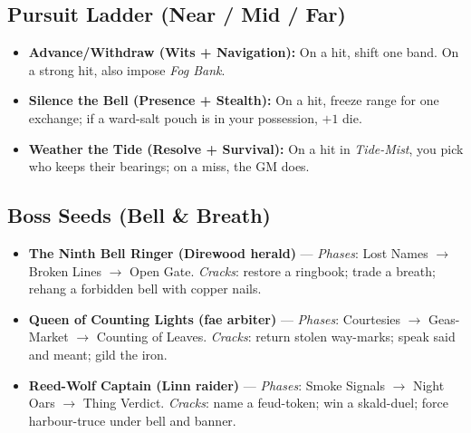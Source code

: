 \subsection*{Pursuit Ladder (Near / Mid / Far)}
\begin{itemize}
\item \textbf{Advance/Withdraw (Wits + Navigation):} On a hit, shift one band. On a strong hit, also impose \emph{Fog Bank}.
\item \textbf{Silence the Bell (Presence + Stealth):} On a hit, freeze range for one exchange; if a ward-salt pouch is in your possession, $+1$ die.
\item \textbf{Weather the Tide (Resolve + Survival):} On a hit in \emph{Tide-Mist}, you pick who keeps their bearings; on a miss, the GM does.
\end{itemize}

\subsection*{Boss Seeds (Bell \& Breath)}
\begin{itemize}
\item \textbf{The Ninth Bell Ringer (Direwood herald)} --- \emph{Phases}: Lost Names $\rightarrow$ Broken Lines $\rightarrow$ Open Gate. \emph{Cracks}: restore a ringbook; trade a breath; rehang a forbidden bell with copper nails.
\item \textbf{Queen of Counting Lights (fae arbiter)} --- \emph{Phases}: Courtesies $\rightarrow$ Geas-Market $\rightarrow$ Counting of Leaves. \emph{Cracks}: return stolen way-marks; speak said and meant; gild the iron.
\item \textbf{Reed-Wolf Captain (Linn raider)} --- \emph{Phases}: Smoke Signals $\rightarrow$ Night Oars $\rightarrow$ Thing Verdict. \emph{Cracks}: name a feud-token; win a skald-duel; force harbour-truce under bell and banner.
\end{itemize}

